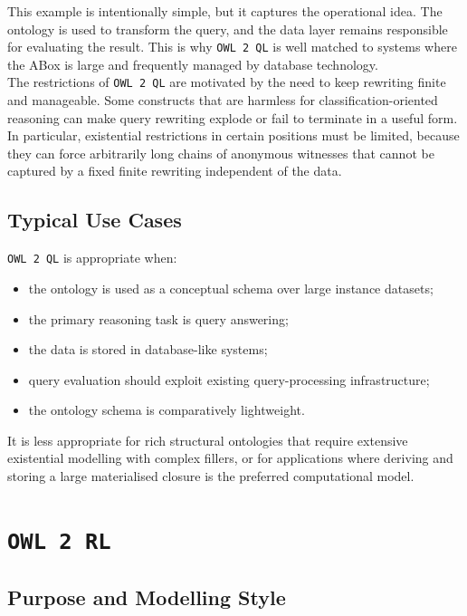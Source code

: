 \documentclass{scrbook}
\begin{document}
	This example is intentionally simple, but it captures the operational idea. The ontology is used to transform the query, and the data layer remains responsible for evaluating the result. This is why \texttt{OWL 2 QL} is well matched to systems where the ABox is large and frequently managed by database technology.\\
	
	The restrictions of \texttt{OWL 2 QL} are motivated by the need to keep rewriting finite and manageable. Some constructs that are harmless for classification-oriented reasoning can make query rewriting explode or fail to terminate in a useful form. In particular, existential restrictions in certain positions must be limited, because they can force arbitrarily long chains of anonymous witnesses that cannot be captured by a fixed finite rewriting independent of the data.
	
	\subsection{Typical Use Cases}
	
	\texttt{OWL 2 QL} is appropriate when:
	\begin{itemize}
		\item the ontology is used as a conceptual schema over large instance datasets;
		\item the primary reasoning task is query answering;
		\item the data is stored in database-like systems;
		\item query evaluation should exploit existing query-processing infrastructure;
		\item the ontology schema is comparatively lightweight.
	\end{itemize}
	
	It is less appropriate for rich structural ontologies that require extensive existential modelling with complex fillers, or for applications where deriving and storing a large materialised closure is the preferred computational model.
	
	\section{\texttt{OWL 2 RL}}
	
	\subsection{Purpose and Modelling Style}
	
\end{document}
